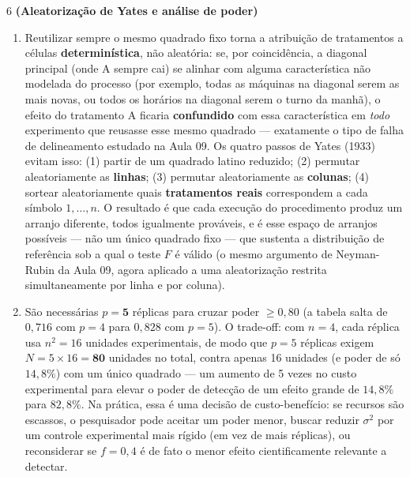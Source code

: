 \documentclass[11pt]{article}
\begin{document}
\begin{questao}{6} \textbf{(Aleatorização de Yates e análise de poder)}
\end{questao}
\begin{solucao}
\begin{enumerate}[label=(\alph*)]
  \item Reutilizar sempre o mesmo quadrado fixo torna a atribuição de tratamentos a células
    \textbf{determinística}, não aleatória: se, por coincidência, a diagonal principal (onde A
    sempre cai) se alinhar com alguma característica não modelada do processo (por exemplo, todas
    as máquinas na diagonal serem as mais novas, ou todos os horários na diagonal serem o turno da
    manhã), o efeito do tratamento A ficaria \textbf{confundido} com essa característica em
    \emph{todo} experimento que reusasse esse mesmo quadrado — exatamente o tipo de falha de
    delineamento estudado na Aula 09. Os quatro passos de Yates (1933) evitam isso: (1) partir de
    um quadrado latino reduzido; (2) permutar aleatoriamente as \textbf{linhas}; (3) permutar
    aleatoriamente as \textbf{colunas}; (4) sortear aleatoriamente quais \textbf{tratamentos
    reais} correspondem a cada símbolo $1,\dots,n$. O resultado é que cada execução do
    procedimento produz um arranjo diferente, todos igualmente prováveis, e é esse espaço de
    arranjos possíveis — não um único quadrado fixo — que sustenta a distribuição de referência
    sob a qual o teste $F$ é válido (o mesmo argumento de Neyman-Rubin da Aula 09, agora aplicado a
    uma aleatorização restrita simultaneamente por linha e por coluna).
  \item São necessárias $p=\textbf{5}$ réplicas para cruzar poder $\ge0{,}80$ (a tabela salta de
    $0{,}716$ com $p=4$ para $0{,}828$ com $p=5$). O trade-off: com $n=4$, cada réplica usa
    $n^2=16$ unidades experimentais, de modo que $p=5$ réplicas exigem $N=5\times16=\textbf{80}$
    unidades no total, contra apenas 16 unidades (e poder de só $14{,}8\%$) com um único quadrado —
    um aumento de 5 vezes no custo experimental para elevar o poder de detecção de um efeito
    grande de $14{,}8\%$ para $82{,}8\%$. Na prática, essa é uma decisão de custo-benefício: se
    recursos são escassos, o pesquisador pode aceitar um poder menor, buscar reduzir $\sigma^2$ por
    um controle experimental mais rígido (em vez de mais réplicas), ou reconsiderar se $f=0{,}4$ é
    de fato o menor efeito cientificamente relevante a detectar.
\end{enumerate}
\end{solucao}
\end{document}
